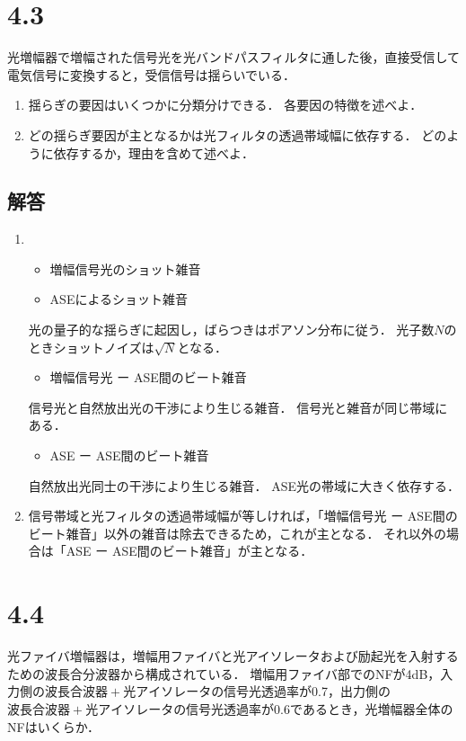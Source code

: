 \section*{4.3}
光増幅器で増幅された信号光を光バンドパスフィルタに通した後，直接受信して電気信号に変換すると，受信信号は揺らいでいる．
\begin{enumerate}
    \renewcommand{\labelenumi}{(\alph{enumi})}
    \item 揺らぎの要因はいくつかに分類分けできる．
          各要因の特徴を述べよ．
    \item どの揺らぎ要因が主となるかは光フィルタの透過帯域幅に依存する．
          どのように依存するか，理由を含めて述べよ．
\end{enumerate}

\subsection*{解答}
\begin{enumerate}
    \renewcommand{\labelenumi}{(\alph{enumi})}
    \item
    \begin{itemize}
        \item 増幅信号光のショット雑音
        \item ASEによるショット雑音
    \end{itemize}
    光の量子的な揺らぎに起因し，ばらつきはポアソン分布に従う．
    光子数$N$のときショットノイズは$\sqrt{N}$となる．
    \begin{itemize}
        \item 増幅信号光 ー ASE間のビート雑音
    \end{itemize}
    信号光と自然放出光の干渉により生じる雑音．
    信号光と雑音が同じ帯域にある．
    \begin{itemize}
        \item ASE ー ASE間のビート雑音
    \end{itemize}
    自然放出光同士の干渉により生じる雑音．
    ASE光の帯域に大きく依存する．
    \item
    信号帯域と光フィルタの透過帯域幅が等しければ，「増幅信号光 ー ASE間のビート雑音」以外の雑音は除去できるため，これが主となる．
    それ以外の場合は「ASE ー ASE間のビート雑音」が主となる．
\end{enumerate}

\section*{4.4}
光ファイバ増幅器は，増幅用ファイバと光アイソレータおよび励起光を入射するための波長合分波器から構成されている．
増幅用ファイバ部でのNFが4dB，入力側の$波長合波器+光アイソレータ$の信号光透過率が0.7，出力側の$波長合波器+光アイソレータ$の信号光透過率が0.6であるとき，光増幅器全体のNFはいくらか．


